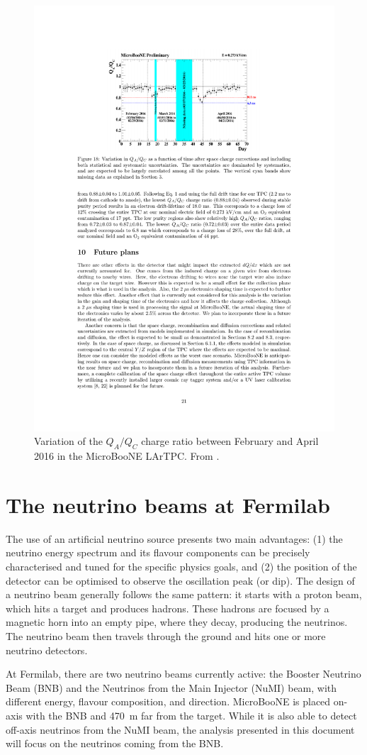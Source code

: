 \begin{figure}[htbp]
    \centering
    \includegraphics[width=0.7\linewidth]{figures/purity.pdf}
    \caption{Variation of the $Q_A/Q_C$ charge ratio between February and April 2016 in the MicroBooNE LArTPC. From \cite{Meddage:2017lxo}.}
    \label{fig:purity}
\end{figure}
 
\section{The neutrino beams at Fermilab}\label{sec:beam}
The use of an artificial neutrino source presents two main advantages: (1) the neutrino energy spectrum and its flavour components can be precisely characterised and tuned for the specific physics goals, and (2) the position of the detector can be optimised to observe the oscillation peak (or dip). The design of a neutrino beam generally follows the same pattern: it starts with a proton beam, which hits a target and produces hadrons. These hadrons are focused by a magnetic horn into an empty pipe, where they decay, producing the neutrinos. The neutrino beam then travels through the ground and hits one or more neutrino detectors.

At Fermilab, there are two neutrino beams currently active: the Booster Neutrino Beam (BNB) and the Neutrinos from the Main Injector (NuMI) beam, with different energy, flavour composition, and direction. MicroBooNE is placed on-axis with the BNB and 470~m far from the target. While it is also able to detect off-axis neutrinos from the NuMI beam, the analysis presented in this document will focus on the neutrinos coming from the BNB.

